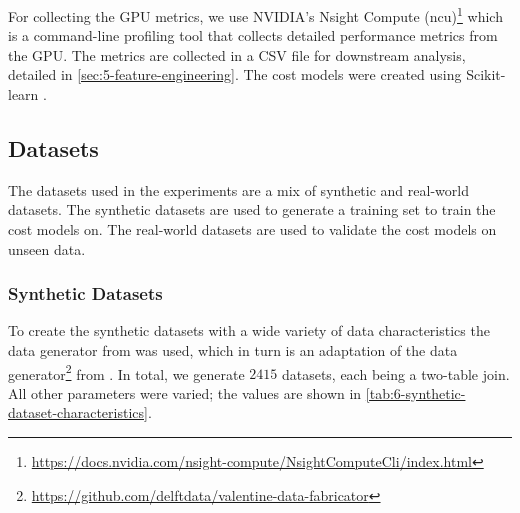 For collecting the GPU metrics, we use NVIDIA's Nsight Compute (ncu)\footnote{\url{https://docs.nvidia.com/nsight-compute/NsightComputeCli/index.html}} which is a command-line profiling tool that collects detailed performance metrics from the GPU. The metrics are collected in a CSV file for downstream analysis, detailed in \autoref{sec:5-feature-engineering}. The cost models were created using Scikit-learn \cite{scikit-learn}.

\subsection{Datasets}
\label{subsec:6-datasets}
The datasets used in the experiments are a mix of synthetic and real-world datasets. The synthetic datasets are used to generate a training set to train the cost models on. The real-world datasets are used to validate the cost models on unseen data.

\subsubsection{Synthetic Datasets}
To create the synthetic datasets with a wide variety of data characteristics the data generator from \cite{schijndel_cost_estimation} was used, which in turn is an adaptation of the data generator\footnote{\url{https://github.com/delftdata/valentine-data-fabricator}} from \cite{valentine-data-generator}. In total, we generate $2415$ datasets, each being a two-table join. All other parameters were varied; the values are shown in \autoref{tab:6-synthetic-dataset-characteristics}.

